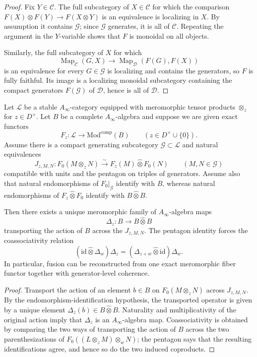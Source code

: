 \begin{proof}
Fix $Y\in\mathcal{C}$. The full subcategory of $X\in\mathcal{C}$ for which the
comparison $F(X)\otimes F(Y)\to F(X\otimes Y)$ is an equivalence is localizing
in $X$. By assumption it contains $\mathcal{G}$; since $\mathcal{G}$ generates,
it is all of $\mathcal{C}$. Repeating the argument in the $Y$-variable shows
that $F$ is monoidal on all objects.

Similarly, the full subcategory of $X$ for which
\[
\operatorname{Map}_{\mathcal{C}}(G,X)
\longrightarrow
\operatorname{Map}_{\mathcal{D}}(F(G),F(X))
\]
is an equivalence for every $G\in\mathcal{G}$ is localizing and contains the
generators, so $F$ is fully faithful. Its image is a localizing monoidal
subcategory containing the compact generators $F(\mathcal{G})$ of
$\mathcal{D}$, hence is all of $\mathcal{D}$.
\end{proof}

\begin{theorem}
\label{thm:meromorphic-tannakian-reconstruction}
Let $\mathcal{L}$ be a stable $A_\infty$-category equipped with meromorphic
tensor products $\otimes_z$ for $z\in D^\times$. Let $B$ be a complete
$A_\infty$-algebra and suppose we are given exact functors
\[
F_z\colon \mathcal{L}\to \mathrm{Mod}^{\mathrm{comp}}(B)
\qquad (z\in D^\times\cup\{0\}).
\]
Assume there is a compact generating subcategory $\mathcal{G}\subset\mathcal{L}$
and natural equivalences
\[
J_{z,M,N}\colon F_0(M\otimes_zN)
\xrightarrow{\sim}
F_z(M)\widehat{\otimes}F_0(N)
\qquad (M,N\in\mathcal{G})
\]
compatible with units and the pentagon on triples of generators. Assume also
that natural endomorphisms of $F_0|_{\mathcal{G}}$ identify with $B$, whereas
natural endomorphisms of $F_z\widehat{\otimes}F_0$ identify with
$B\widehat{\otimes}B$.

Then there exists a unique meromorphic family of $A_\infty$-algebra maps
\[
\Delta_z\colon B\to B\widehat{\otimes}B
\]
transporting the action of $B$ across the $J_{z,M,N}$. The pentagon identity
forces the coassociativity relation
\[
(\mathrm{id}\widehat{\otimes}\Delta_w)\Delta_z
=
(\Delta_{z+w}\widehat{\otimes}\mathrm{id})\Delta_w.
\]
In particular, fusion can be reconstructed from one exact meromorphic fiber
functor together with generator-level coherence.
\end{theorem}

\begin{proof}
Transport the action of an element $b\in B$ on $F_0(M\otimes_zN)$ across
$J_{z,M,N}$. By the endomorphism-identification hypothesis, the transported
operator is given by a unique element $\Delta_z(b)\in B\widehat{\otimes}B$.
Naturality and multiplicativity of the original action imply that $\Delta_z$ is
an $A_\infty$-algebra map. Coassociativity is obtained by comparing the two
ways of transporting the action of $B$ across the two parenthesizations of
$F_0((L\otimes_zM)\otimes_wN)$; the pentagon says that the resulting
identifications agree, and hence so do the two induced coproducts.
\end{proof}

